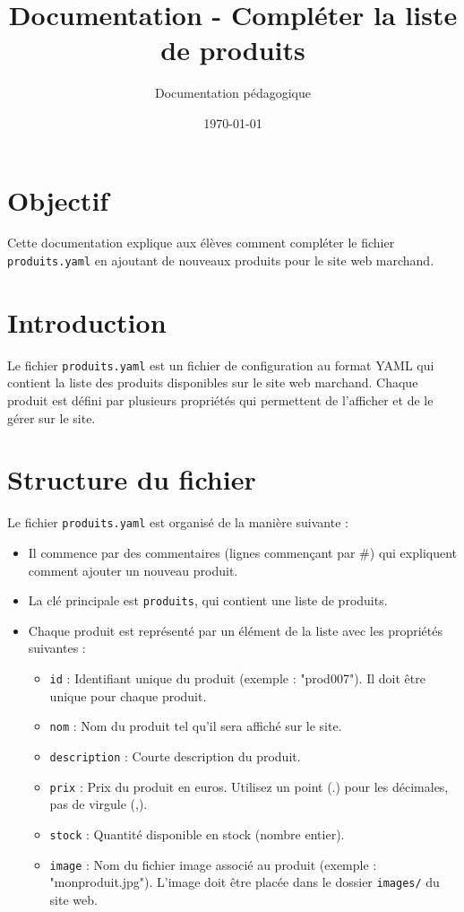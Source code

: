 \documentclass[11pt]{article}
\title{Documentation - Compléter la liste de produits}
\author{Documentation pédagogique}
\date{\today}
\begin{document}
\maketitle

\tableofcontents

\newpage

\section{Objectif}

Cette documentation explique aux élèves comment compléter le fichier \texttt{produits.yaml} en ajoutant de nouveaux produits pour le site web marchand.

\section{Introduction}

Le fichier \texttt{produits.yaml} est un fichier de configuration au format YAML qui contient la liste des produits disponibles sur le site web marchand. Chaque produit est défini par plusieurs propriétés qui permettent de l'afficher et de le gérer sur le site.

\section{Structure du fichier}

Le fichier \texttt{produits.yaml} est organisé de la manière suivante :

\begin{itemize}
\item Il commence par des commentaires (lignes commençant par \#) qui expliquent comment ajouter un nouveau produit.
\item La clé principale est \texttt{produits}, qui contient une liste de produits.
\item Chaque produit est représenté par un élément de la liste avec les propriétés suivantes :
  \begin{itemize}
  \item \texttt{id} : Identifiant unique du produit (exemple : "prod007"). Il doit être unique pour chaque produit.
  \item \texttt{nom} : Nom du produit tel qu'il sera affiché sur le site.
  \item \texttt{description} : Courte description du produit.
  \item \texttt{prix} : Prix du produit en euros. Utilisez un point (.) pour les décimales, pas de virgule (,).
  \item \texttt{stock} : Quantité disponible en stock (nombre entier).
  \item \texttt{image} : Nom du fichier image associé au produit (exemple : "monproduit.jpg"). L'image doit être placée dans le dossier \texttt{images/} du site web.
  \end{itemize}
\end{itemize}
\end{document}
